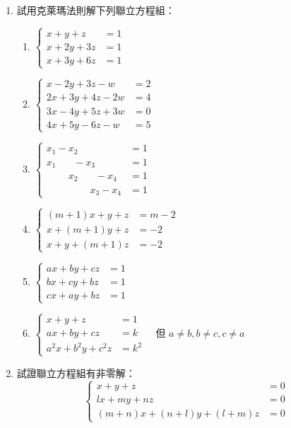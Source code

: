 \begin{enumerate}[label=\arabic*., leftmargin=2em]
  \item 試用克萊瑪法則解下列聯立方程組：
  \begin{enumerate}[label=(\roman*)]
    \item $\left\{\begin{aligned}
    x+y+z &= 1 \\
    x+2y+3z &= 1 \\
    x+3y+6z &= 1
    \end{aligned}\right.$
    \item $\left\{\begin{aligned}
    x-2y+3z-w &= 2 \\
    2x+3y+4z-2w &= 4 \\
    3x-4y+5z+3w &= 0 \\
    4x+5y-6z-w &= 5
    \end{aligned}\right.$
    \item $\left\{\begin{aligned}
    x_1-x_2 \phantom{+ x_3 - x_4} &= 1 \\
    x_1 \phantom{- x_2} - x_3 \phantom{- x_4} &= 1 \\
    \phantom{x_1 +} x_2 \phantom{- x_3} - x_4 &= 1 \\
    \phantom{x_1 + x_2 +} x_3 - x_4 &= 1
    \end{aligned}\right.$
    \item $\left\{\begin{aligned}
    (m+1)x + y + z &= m-2 \\
    x + (m+1)y + z &= -2 \\
    x + y + (m+1)z &= -2
    \end{aligned}\right.$
    \item $\left\{\begin{aligned}
    ax+by+cz &= 1 \\
    bx+cy+bz &= 1 \\
    cx+ay+bz &= 1
    \end{aligned}\right.$
    \item $\left\{\begin{aligned}
    x+y+z &= 1 \\
    ax+by+cz &= k \\
    a^2x+b^2y+c^2z &= k^2
    \end{aligned}\right. \quad \text{但 } a \ne b, b \ne c, c \ne a$
  \end{enumerate}

  \item 試證聯立方程組有非零解：
  \[ \left\{\begin{aligned}
  x+y+z &= 0 \\
  lx+my+nz &= 0 \\
  (m+n)x + (n+l)y + (l+m)z &= 0
  \end{aligned}\right. \]


\end{enumerate}
